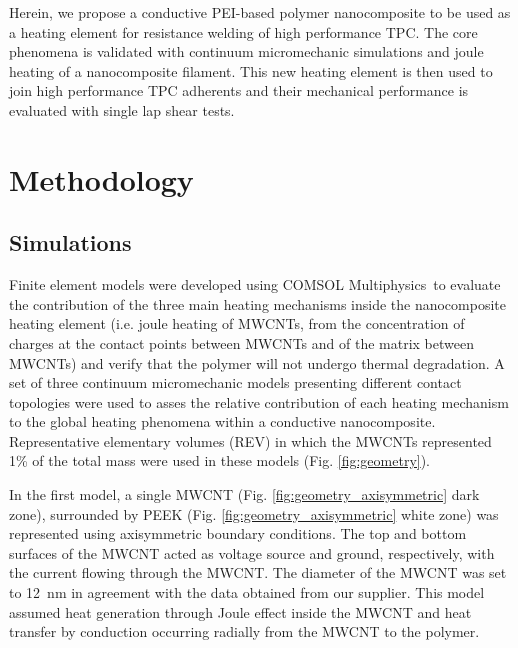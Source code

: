 \documentclass[11pt,review,times]{elsarticle}
\begin{document}
Herein, we propose a conductive PEI-based polymer nanocomposite to be used as a heating element for resistance welding of high performance TPC. 
The core phenomena is validated with continuum micromechanic simulations and joule heating of a nanocomposite filament. 
This new heating element is then used to join high performance TPC adherents and their mechanical performance is evaluated with single lap shear tests. 

							\section{Methodology}

\subsection{Simulations}

Finite element models were developed using COMSOL Mul\-ti\-phy\-sics\-\textregistered \ to evaluate the contribution of the three main heating mechanisms inside the nanocomposite heating element (i.e. joule heating of MWCNTs, from the concentration of charges at the contact points between MWCNTs and of the matrix between MWCNTs) and verify that the polymer will not undergo thermal degradation.  
A set of three continuum micromechanic models presenting different contact topologies were used to asses the relative contribution of each heating mechanism to the global heating phenomena within a conductive nanocomposite. 
Representative elementary volumes (REV) in which the MWCNTs represented 1\% of the total mass were used in these models (Fig. \ref{fig:geometry}). 

In the first model, a single MWCNT (Fig. \ref{fig:geometry_axisymmetric} dark zone), surrounded by PEEK (Fig. \ref{fig:geometry_axisymmetric} white zone) was represented using axisymmetric boundary conditions. 
The top and bottom surfaces of the MWCNT acted as voltage source and ground, respectively, with the current flowing through the MWCNT. 
The diameter of the MWCNT was set to \SI{12}{\nano\metre} in agreement with the data obtained from our supplier. 
This model assumed heat generation through Joule effect inside the MWCNT and heat transfer by conduction occurring radially from the MWCNT to the polymer.
\end{document}
